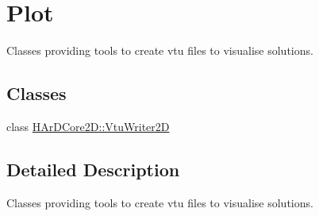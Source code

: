 \hypertarget{group__Plot}{}\section{Plot}
\label{group__Plot}


Classes providing tools to create vtu files to visualise solutions.  


\subsection*{Classes}
\begin{DoxyCompactItemize}
\item 
class \hyperlink{classHArDCore2D_1_1VtuWriter2D}{H\+Ar\+D\+Core2\+D\+::\+Vtu\+Writer2D}
\end{DoxyCompactItemize}


\subsection{Detailed Description}
Classes providing tools to create vtu files to visualise solutions. 

